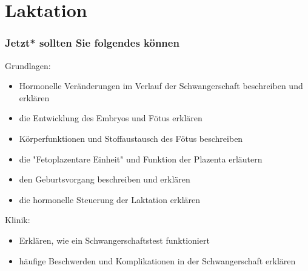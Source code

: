 \documentclass{beamer}
\begin{document}
\section{Laktation}









\begin{frame}

 \frametitle{Jetzt* sollten Sie folgendes können}



\begin{block}{Grundlagen:}
\begin{itemize}
\item
Hormonelle Veränderungen im Verlauf der Schwangerschaft beschreiben und erklären
\item
die Entwicklung des Embryos und Fötus erklären 
\item
Körperfunktionen und Stoffaustausch des Fötus beschreiben
\item
die "Fetoplazentare Einheit" und Funktion der Plazenta erläutern
\item
den Geburtsvorgang beschreiben und erklären
\item
die hormonelle Steuerung der Laktation erklären

\end{itemize}

\end{block}



\begin{block}{Klinik:}
\begin{itemize}
\item
Erklären, wie ein Schwangerschaftstest funktioniert
\item
häufige Beschwerden und Komplikationen in der Schwangerschaft erklären

\end{itemize}

\end{block}

\end{frame}





\end{document}
